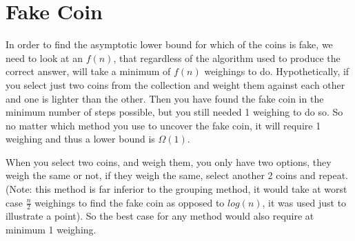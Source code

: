 \documentclass[12pt]{article}
\begin{document}
\pagebreak

\section{Fake Coin}

In order to find the asymptotic lower bound for which of the coins is fake, we need to look at an $f(n)$, that regardless of the algorithm used to produce the correct answer, will take a minimum of $f(n)$ weighings to do. Hypothetically, if you select just two coins from the collection and weight them against each other and one is lighter than the other. Then you have found the fake coin in the minimum number of steps possible, but you still needed 1 weighing to do so. So no matter which method you use to uncover the fake coin, it will require 1 weighing and thus a lower bound is $\Omega(1)$.

\begin{center}
\end{center}

When you select two coins, and weigh them, you only have two options, they weigh the same or not, if they weigh the same, select another 2 coins and repeat. (Note: this method is far inferior to the grouping method, it would take at worst case $\frac{n}{2}$ weighings to find the fake coin as opposed to $log(n)$, it was used just to illustrate a point). So the best case for any method would also require at minimum 1 weighing.
\end{document}

